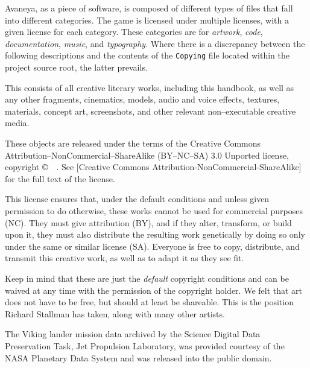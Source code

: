 

Avaneya, as a piece of software, is composed of different types of files that fall into different categories. The game is licensed under multiple licenses, with a given license for each category. These categories are for {\it artwork}, {\it code}, {\it documentation}, {\it music}, and {\it typography}. Where there is a discrepancy between the following descriptions and the contents of the {\tt Copying} file located within the project source root, the latter prevails.

\startitemize[4]

This consists of all creative literary works, including this handbook, as well as any other fragments, cinematics, models, audio and voice effects, textures, materials, concept art, screenshots, and other relevant non--executable creative media.

These objects are released under the terms of the Creative Commons Attribution--NonCommercial--ShareAlike (BY--NC--SA) 3.0 Unported license, copyright \copyright\ \CopyrightDates\ \CopyrightHolder. See [Creative Commons Attribution-NonCommercial-ShareAlike] for the full text of the license.

This license ensures that, under the default conditions and unless given permission to do otherwise, these works cannot be used for commercial purposes (NC). They must give attribution (BY), and if they alter, transform, or build upon it, they must also distribute the resulting work genetically by doing so only under the same or similar license (SA). Everyone is free to copy, distribute, and transmit this creative work, as well as to adapt it as they see fit. 

Keep in mind that these are just the {\it default} copyright conditions and can be waived at any time with the permission of the copyright holder. We felt that art does not have to be free, but should at least be shareable. This is the position Richard Stallman has taken, along with many other artists.

The Viking lander mission data archived by the Science Digital Data Preservation Task, Jet Propulsion Laboratory, was provided courtesy of the NASA Planetary Data System and was released into the public domain.


